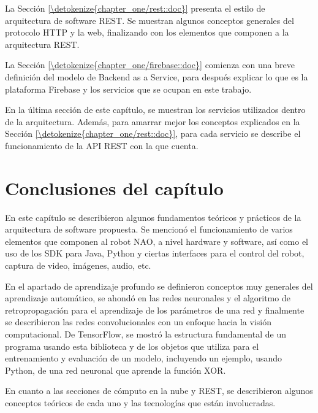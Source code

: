 \documentclass[letterpaper,12pt,spanish]{report}
\begin{document}
La Sección \ref{\detokenize{chapter_one/rest::doc}}
presenta el estilo de arquitectura de software REST.
Se muestran algunos conceptos generales del protocolo
HTTP y la web, finalizando con los elementos 
que componen a la arquitectura REST.

La Sección \ref{\detokenize{chapter_one/firebase::doc}}
comienza con una breve definición del modelo 
de Backend as a Service, para después
explicar lo que es la plataforma Firebase y los servicios
que se ocupan en este trabajo.

En la última sección de este capítulo, se muestran los 
servicios utilizados dentro de la arquitectura. Además,
para amarrar mejor los conceptos explicados 
en la Sección \ref{\detokenize{chapter_one/rest::doc}},
para cada servicio se describe el funcionamiento
de la API REST con la que cuenta.









\section*{Conclusiones del capítulo}
En este capítulo se describieron algunos 
fundamentos teóricos y prácticos de la arquitectura de software 
propuesta. Se mencionó el funcionamiento de varios elementos que 
componen al robot NAO, a nivel hardware y software, así como el uso de los SDK para Java, Python y
ciertas interfaces para el control del robot, captura de 
video, imágenes, audio, etc. 

En el apartado de aprendizaje profundo se definieron 
conceptos muy generales del aprendizaje automático,
se ahondó en las redes neuronales y el algoritmo de 
retropropagación para el aprendizaje de los parámetros
de una red y finalmente se describieron las redes
convolucionales con un enfoque hacia la visión 
computacional. De TensorFlow, se mostró 
la estructura fundamental de un programa usando esta
biblioteca y de los objetos que utiliza
para el entrenamiento y evaluación de un modelo, 
incluyendo un ejemplo, usando Python, de una
red neuronal que aprende la función XOR. 

En cuanto a las secciones de cómputo en la nube
y REST, se describieron algunos conceptos teóricos
de cada uno y las tecnologías que están involucradas.
\end{document}
